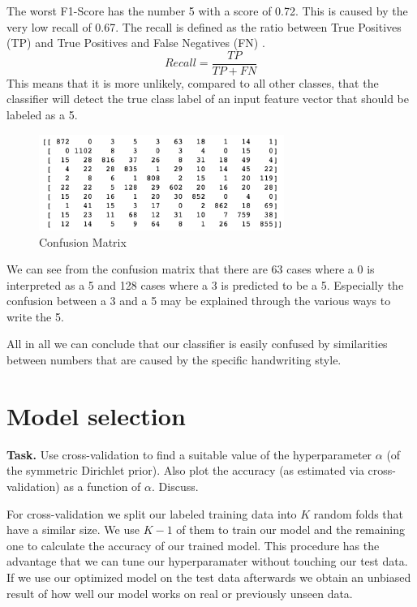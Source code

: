 \documentclass{support/acm_proc_article-sp}
\begin{document}
    The worst F1-Score has the number 5 with a score of 0.72.
    This is caused by the very low recall of 0.67.
    The recall is defined as the ratio between True Positives (TP) and True Positives and False Negatives (FN) \cite{evaluation}.
    \begin{equation}
        Recall = \frac{TP}{TP + FN}
    \end{equation}
    This means that it is more unlikely, compared to all other classes, that the classifier will detect the true class
    label of an input feature vector that should be labeled as a 5.

    \begin{figure}[!htbp]
        \centering
        \includegraphics[width=8cm]{images/confusion-matrix.png}
        \caption{Confusion Matrix}
        \label{fig:confusion-matrix}
    \end{figure}
    We can see from the confusion matrix that there are 63 cases where a 0 is interpreted as a 5 and 128 cases where
    a 3 is predicted to be a 5.
    Especially the confusion between a 3 and a 5 may be explained through the various ways to write the 5.

    All in all we can conclude that our classifier is easily confused by similarities between numbers that
    are caused by the specific handwriting style.


    \section{Model selection}
    \label{sec:model-selection}

    \textbf{Task.} Use cross-validation to find a suitable value of the hyperparameter $\alpha$ (of the symmetric Dirichlet prior).
    Also plot the accuracy (as estimated via cross-validation) as a function of $\alpha$.
    Discuss.

    For cross-validation we split our labeled training data into $K$ random folds that have a similar size.
    We use $K - 1$ of them to train our model and the remaining one to calculate the accuracy of our trained model.
    This procedure has the advantage that we can tune our hyperparamater without touching our test data.
    If we use our optimized model on the test data afterwards we obtain an unbiased result of how well our model
    works on real or previously unseen data.
\end{document}
